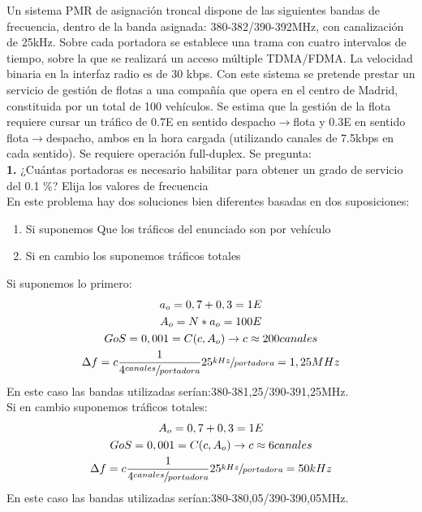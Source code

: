 \begin{exercise}[2]
	Un sistema PMR de asignación troncal dispone de las siguientes bandas de frecuencia, dentro de la banda asignada: 380-382/390-392MHz, con canalización de 25kHz. Sobre cada portadora se establece una trama con cuatro intervalos de tiempo, sobre la que se realizará un acceso múltiple TDMA/FDMA. La velocidad binaria en la interfaz radio es de 30 kbps. Con este sistema se pretende prestar un servicio de gestión de flotas a una compañía que opera en el centro de Madrid, constituida por un total de 100 vehículos. Se estima que la gestión de la flota requiere cursar un tráfico de 0.7E en sentido despacho$\to$flota y 0.3E en sentido flota$\to$despacho, ambos en la hora cargada (utilizando canales de 7.5kbps en cada sentido). Se requiere operación full-duplex. Se pregunta:\\
	\textbf{1.} ¿Cuántas portadoras es necesario habilitar para obtener un grado de servicio del 0.1 \%? Elija los valores de frecuencia\\
	En este problema hay dos soluciones bien diferentes basadas en dos suposiciones: 
	\begin{enumerate}
		\item Si suponemos Que los tráficos del enunciado son por vehículo 
		\item Si en cambio los suponemos tráficos totales
	\end{enumerate}
	Si suponemos lo primero:
	\begin{gather*}
		a_o=0,7+0,3=1E\\
		A_o=N*a_o=100E\\
		GoS=0,001=C(c,A_o)\to c\approx 200canales\\
		\Delta f=c\frac{1}{4\sfrac{canales}{portadora}}25\sfrac{kHz}{portadora}=1,25MHz
	\end{gather*}
	En este caso las bandas utilizadas serían:380-381,25/390-391,25MHz.\\
	Si en cambio suponemos tráficos totales:
	\begin{gather*}
		A_o=0,7+0,3=1E\\
		GoS=0,001=C(c,A_o)\to c\approx 6canales\\
		\Delta f=c\frac{1}{4\sfrac{canales}{portadora}}25\sfrac{kHz}{portadora}=50kHz
	\end{gather*}
	En este caso las bandas utilizadas serían:380-380,05/390-390,05MHz.\\

\end{exercise}
